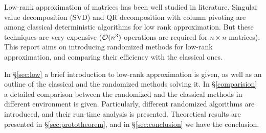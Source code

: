 \documentclass[12pt]{article}
\begin{document}


Low-rank approximation of matrices has been well studied in literature.
Singular value decomposition (SVD) and QR decomposition with column pivoting
are among classical deterministic algorithms for low rank approximation.
But these techniques are very expensive ($\mathcal{O}(n^{3})$ operations are required for $n\times n$ matrices). This report aims on introducing randomized methods for low-rank approximation, and comparing their efficiency with the classical ones.

In \S\ref{sec:low} a brief introduction to low-rank approximation is given, as well as an outline of the classical and the randomized methods solving it. 
In \S\ref{comparision} a detailed comparison between the randomized and the classical methods in different environment is given. Particularly, different randomized algorithms are introduced, and their run-time analysis is presented.
Theoretical results are presented in \S\ref{sec:prototheorem}, and in \S\ref{sec:conclusion} we have the conclusion.
\end{document}
